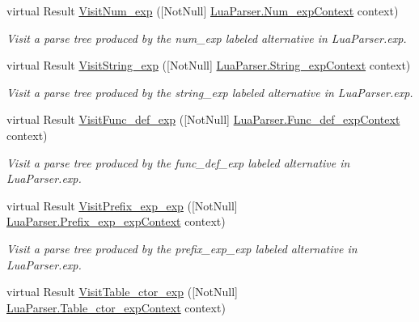 \begin{DoxyCompactItemize}
virtual Result \mbox{\hyperlink{classzlua_1_1_lua_base_visitor_a8d8efa823f6a737821a8b4d10bfe2cd9}{Visit\+Num\+\_\+exp}} (\mbox{[}Not\+Null\mbox{]} \mbox{\hyperlink{classzlua_1_1_lua_parser_1_1_num__exp_context}{Lua\+Parser.\+Num\+\_\+exp\+Context}} context)
\begin{DoxyCompactList}\small\item\em Visit a parse tree produced by the {\ttfamily num\+\_\+exp} labeled alternative in Lua\+Parser.\+exp. \end{DoxyCompactList}\item 
virtual Result \mbox{\hyperlink{classzlua_1_1_lua_base_visitor_a7a571a797280a12b079c84c9c2438f5f}{Visit\+String\+\_\+exp}} (\mbox{[}Not\+Null\mbox{]} \mbox{\hyperlink{classzlua_1_1_lua_parser_1_1_string__exp_context}{Lua\+Parser.\+String\+\_\+exp\+Context}} context)
\begin{DoxyCompactList}\small\item\em Visit a parse tree produced by the {\ttfamily string\+\_\+exp} labeled alternative in Lua\+Parser.\+exp. \end{DoxyCompactList}\item 
virtual Result \mbox{\hyperlink{classzlua_1_1_lua_base_visitor_adfce03f603d9109a1cac5ff92c9b8642}{Visit\+Func\+\_\+def\+\_\+exp}} (\mbox{[}Not\+Null\mbox{]} \mbox{\hyperlink{classzlua_1_1_lua_parser_1_1_func__def__exp_context}{Lua\+Parser.\+Func\+\_\+def\+\_\+exp\+Context}} context)
\begin{DoxyCompactList}\small\item\em Visit a parse tree produced by the {\ttfamily func\+\_\+def\+\_\+exp} labeled alternative in Lua\+Parser.\+exp. \end{DoxyCompactList}\item 
virtual Result \mbox{\hyperlink{classzlua_1_1_lua_base_visitor_a77ce0adce8dcce58ae649a008ff905bc}{Visit\+Prefix\+\_\+exp\+\_\+exp}} (\mbox{[}Not\+Null\mbox{]} \mbox{\hyperlink{classzlua_1_1_lua_parser_1_1_prefix__exp__exp_context}{Lua\+Parser.\+Prefix\+\_\+exp\+\_\+exp\+Context}} context)
\begin{DoxyCompactList}\small\item\em Visit a parse tree produced by the {\ttfamily prefix\+\_\+exp\+\_\+exp} labeled alternative in Lua\+Parser.\+exp. \end{DoxyCompactList}\item 
virtual Result \mbox{\hyperlink{classzlua_1_1_lua_base_visitor_a074674e65df701a19707c8c7d32e7aec}{Visit\+Table\+\_\+ctor\+\_\+exp}} (\mbox{[}Not\+Null\mbox{]} \mbox{\hyperlink{classzlua_1_1_lua_parser_1_1_table__ctor__exp_context}{Lua\+Parser.\+Table\+\_\+ctor\+\_\+exp\+Context}} context)

\end{DoxyCompactItemize}
